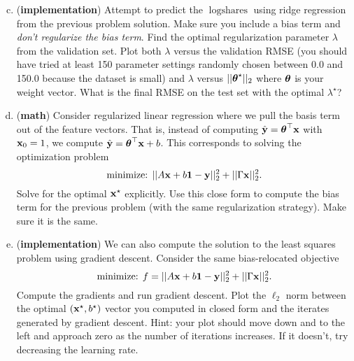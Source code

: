 \documentclass[12pt,letterpaper]{hmcpset}
\begin{document}
\begin{problem}[4 (continued)]
\begin{enumerate}[(a)]
	\setcounter{enumi}{2}
\item (\textbf{implementation}) Attempt to predict the $\log\text{shares}$ using ridge
regression from the previous problem solution. Make sure you include a bias
term and \textit{don't regularize the bias term}.
Find the optimal regularization parameter $\lambda$
from the validation set. Plot both $\lambda$ versus the validation RMSE (you should have
tried at least 150 parameter settings randomly chosen between 0.0 and 150.0 because
the dataset is small)
and $\lambda$ versus $||\hbox{\boldmath$\theta$}^\star||_2$ where $\hbox{\boldmath$\theta$}$ is your weight vector.
What is the final RMSE on the test set with the optimal $\lambda^\star$?
\item (\textbf{math}) Consider regularized linear regression where we pull the
basis term out of the feature vectors. That is, instead of computing $\hat{{\bf y}}
= \hbox{\boldmath$\theta$}^\top{\bf x}$ with ${\bf x}_0 = 1$, we compute $\hat{{\bf y}} = \hbox{\boldmath$\theta$}^\top{\bf x} + b$.
This corresponds to solving the optimization problem
\[
\text{minimize: } ||A{\bf x} + b{\bf 1} - {\bf y}||_2^2 + ||\Gamma{\bf x}||_2^2.
\]
Solve for the optimal ${\bf x}^\star$ explicitly. Use this close form to compute the
bias term for the previous problem (with the same regularization strategy). Make
sure it is the same.
\item (\textbf{implementation}) We can also compute the solution to the least squares
problem using gradient descent. Consider the same bias-relocated objective
\[
\text{minimize: } f = ||A{\bf x} + b{\bf 1} - {\bf y}||_2^2 + ||\Gamma{\bf x}||_2^2.
\]
Compute the gradients and run gradient descent. Plot the $\ell_2$ norm
between the optimal $({\bf x}^\star, b^\star)$ vector you computed in closed form
and the iterates generated by gradient descent. Hint: your plot should move
down and to the left and approach zero as the number of iterations increases. If
it doesn't, try decreasing the learning rate.
\end{enumerate}
\end{problem}
\begin{solution}
	\vfill
\end{solution}
\newpage
\end{document}
